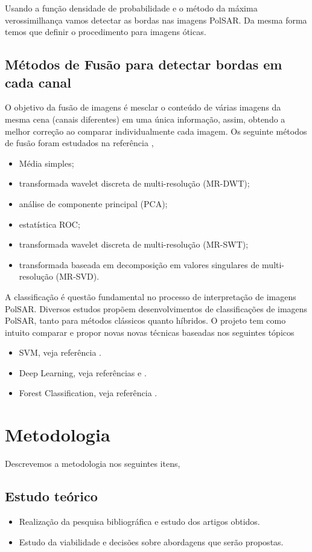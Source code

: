 \documentclass[runningheads]{llncs}
\begin{document}
Usando a função densidade de probabilidade e o método da máxima verossimilhança vamos detectar as bordas nas imagens PolSAR. Da mesma forma temos que definir o procedimento para imagens óticas. 
\subsection{Métodos de Fusão para detectar bordas em cada canal}
 O objetivo da fusão de imagens é mesclar o conteúdo de várias imagens da mesma cena (canais diferentes) em uma única informação, assim, obtendo a melhor correção ao comparar individualmente cada imagem. Os seguinte métodos de fusão foram estudados na referência \cite{bmf_2020},
\begin{itemize}
  \item Média simples;
  \item transformada wavelet discreta de multi-resolução (MR-DWT);
  \item análise de componente principal (PCA);
  \item estatística ROC;
  \item transformada wavelet discreta de multi-resolução (MR-SWT);
  \item transformada baseada em decomposição em valores singulares de multi-resolução (MR-SVD).
\end{itemize}

A classificação é questão fundamental no
processo de interpretação de imagens PolSAR. Diversos estudos propõem desenvolvimentos de classificações de imagens PolSAR, tanto para métodos clássicos quanto híbridos. O projeto tem como intuito comparar e propor novas novas técnicas baseadas nos seguintes tópicos 
\begin{itemize}
  \item SVM, veja referência \cite{ref_proc1}.
  \item Deep Learning, veja referências \cite{ref_proc3} e \cite{ztmxzxf}.
  \item Forest Classification, veja referência \cite{ref_proc1}.
\end{itemize}

\section{Metodologia}
Descrevemos a metodologia nos seguintes itens,
\subsection{Estudo teórico}
\begin{itemize}
  \item Realização da pesquisa bibliográfica e estudo dos artigos obtidos.
  \item Estudo da viabilidade e decisões sobre abordagens que serão propostas.
\end{itemize}
\end{document}
